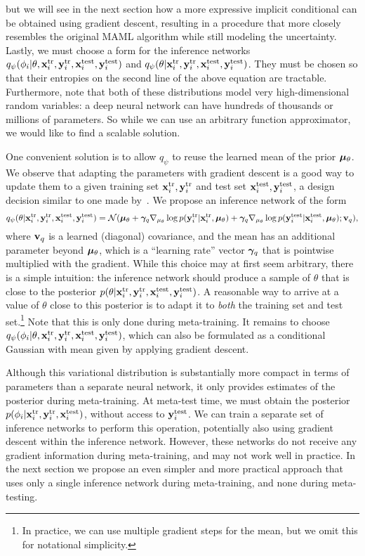 \documentclass{article}
\begin{document}
but we will see in the next section how a more expressive implicit conditional can be obtained using gradient descent, resulting in a procedure that more closely resembles the original MAML algorithm while still modeling the uncertainty. Lastly, we must choose a form for the inference networks $q_\psi(\phi_i | \theta, \mathbf{x}^{\text{tr}}_i, \mathbf{y}^{\text{tr}}_i, \mathbf{x}^{\text{test}}_i, \mathbf{y}^{\text{test}}_i)$ and $q_\psi(\theta | \mathbf{x}^{\text{tr}}_i, \mathbf{y}^{\text{tr}}_i, \mathbf{x}^{\text{test}}_i, \mathbf{y}^{\text{test}}_i)$. They must be chosen so that their entropies on the second line of the above equation are tractable. Furthermore, note that both of these distributions model very high-dimensional random variables: a deep neural network can have hundreds of thousands or millions of parameters. So while we can use an arbitrary function approximator, we would like to find a scalable solution.

One convenient solution is to allow $q_\psi$ to reuse the learned mean of the prior $\bm{\mu}_\theta$. We observe that adapting the parameters with gradient descent is a good way to update them to a given training set $\mathbf{x}^{\text{tr}}_i, \mathbf{y}^{\text{tr}}_i$ and test set $\mathbf{x}^{\text{test}}_i, \mathbf{y}^{\text{test}}_i$, a design decision similar to one made by~\citet{bayesianrnn}. We propose an inference network of the form
\[
q_\psi(\theta | \mathbf{x}^{\text{tr}}_i, \mathbf{y}^{\text{tr}}_i, \mathbf{x}^{\text{test}}_i, \mathbf{y}^{\text{test}}_i) = \mathcal{N}(\bm{\mu}_\theta + \bm{\gamma}_q \nabla_{\mu_\theta} \log p(\mathbf{y}^{\text{tr}}_i | \mathbf{x}^{\text{tr}}_i, \bm{\mu}_\theta) + \bm{\gamma}_q \nabla_{\mu_\theta} \log p(\mathbf{y}^{\text{test}}_i | \mathbf{x}^{\text{test}}_i, \bm{\mu}_\theta) ; \mathbf{v}_q),
\]
where $\mathbf{v}_q$ is a learned (diagonal) covariance, and the mean has an additional parameter beyond $\bm{\mu}_\theta$, which is a ``learning rate'' vector $\bm{\gamma}_q$ that is pointwise multiplied with the gradient.
While this choice may at first seem arbitrary, there is a simple intuition: the inference network should produce a sample of $\theta$ that is close to the posterior $p(\theta | \mathbf{x}^{\text{tr}}_i, \mathbf{y}^{\text{tr}}_i, \mathbf{x}^{\text{test}}_i, \mathbf{y}^{\text{test}}_i)$. A reasonable way to arrive at a value of $\theta$ close to this posterior is to adapt it to \emph{both} the training set and test set.\footnote{In practice, we can use multiple gradient steps for the mean, but we omit this for notational simplicity.} Note that this is only done during meta-training.
It remains to choose $q_\psi(\phi_i | \theta, \mathbf{x}^{\text{tr}}_i, \mathbf{y}^{\text{tr}}_i, \mathbf{x}^{\text{test}}_i, \mathbf{y}^{\text{test}}_i)$, which can also be formulated as a conditional Gaussian with mean given by applying gradient descent.

Although this variational distribution is substantially more compact in terms of parameters than a separate neural network, it only provides estimates of the posterior during meta-training. At meta-test time, we must obtain the posterior $p(\phi_i | \mathbf{x}^{\text{tr}}_i, \mathbf{y}^{\text{tr}}_i, \mathbf{x}^{\text{test}}_i)$, without access to $\mathbf{y}^{\text{test}}_i$. We can train a separate set of inference networks to perform this operation, potentially also using gradient descent within the inference network. However, these networks do not receive any gradient information during meta-training, and may not work well in practice.
In the next section we propose an even simpler and more practical approach that uses only a single inference network during meta-training, and none during meta-testing.
\end{document}
